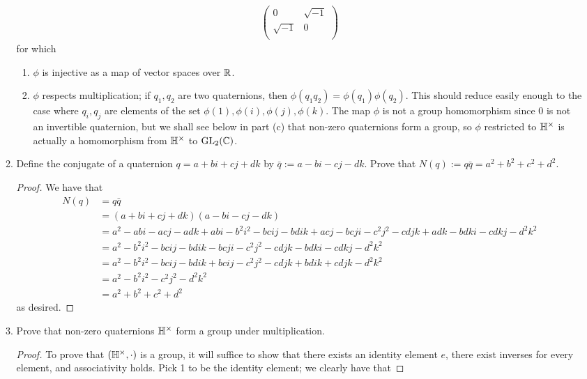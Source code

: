 \documentclass[../psets.tex]{subfiles}
\begin{document}
\begin{enumerate}
\begin{enumerate}
\begin{align*}
            \begin{pmatrix}
                0 & \sqrt{-1}\\
                \sqrt{-1} & 0\\
            \end{pmatrix}
        \end{align*}
        for which
        \begin{enumerate}
            \item $\phi$ is injective as a map of vector spaces over $\mathbb{R}$.
            \item $\phi$ respects multiplication; if $q_1,q_2$ are two quaternions, then $\phi(q_1q_2)=\phi(q_1)\phi(q_2)$. This should reduce easily enough to the case where $q_i,q_j$ are elements of the set $\phi(1),\phi(i),\phi(j),\phi(k)$. The map $\phi$ is not a group homomorphism since 0 is not an invertible quaternion, but we shall see below in part (c) that non-zero quaternions form a group, so $\phi$ restricted to $\mathbb{H}^\times$ is actually a homomorphism from $\mathbb{H}^\times$ to $\text{GL}_2(\mathbb{C})$.
        \end{enumerate}
        \item Define the conjugate of a quaternion $q=a+bi+cj+dk$ by $\bar{q}:=a-bi-cj-dk$. Prove that $N(q):=q\bar{q}=a^2+b^2+c^2+d^2$.
        \begin{proof}
            We have that
            \begin{align*}
                N(q) &= q\bar{q}\\
                &= (a+bi+cj+dk)(a-bi-cj-dk)\\
                &= a^2-abi-acj-adk+abi-b^2i^2-bcij-bdik+acj-bcji-c^2j^2-cdjk+adk-bdki-cdkj-d^2k^2\\
                &= a^2-b^2i^2-bcij-bdik-bcji-c^2j^2-cdjk-bdki-cdkj-d^2k^2\\
                &= a^2-b^2i^2-bcij-bdik+bcij-c^2j^2-cdjk+bdik+cdjk-d^2k^2\\
                &= a^2-b^2i^2-c^2j^2-d^2k^2\\
                &= a^2+b^2+c^2+d^2
            \end{align*}
            as desired.
        \end{proof}
        \item Prove that non-zero quaternions $\mathbb{H}^\times$ form a group under multiplication.
        \begin{proof}
            To prove that $(\mathbb{H}^\times,\cdot)$ is a group, it will suffice to show that there exists an identity element $e$, there exist inverses for every element, and associativity holds. Pick 1 to be the identity element; we clearly have that

\end{proof}
\end{enumerate}
\end{enumerate}
\end{document}
